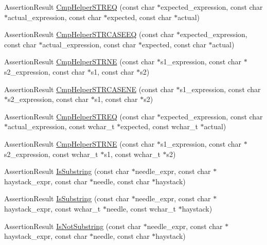 \begin{DoxyCompactItemize}
\item 
\-Assertion\-Result \hyperlink{namespacetesting_1_1internal_aac3ea8412a9d5f786b992a2b06aeb353}{\-Cmp\-Helper\-S\-T\-R\-E\-Q} (const char $\ast$expected\-\_\-expression, const char $\ast$actual\-\_\-expression, const char $\ast$expected, const char $\ast$actual)
\item 
\-Assertion\-Result \hyperlink{namespacetesting_1_1internal_aa5c3543f39545113a66c5b4d8f829fc6}{\-Cmp\-Helper\-S\-T\-R\-C\-A\-S\-E\-E\-Q} (const char $\ast$expected\-\_\-expression, const char $\ast$actual\-\_\-expression, const char $\ast$expected, const char $\ast$actual)
\item 
\-Assertion\-Result \hyperlink{namespacetesting_1_1internal_a24dfe04b51cda2637868440f0e6a7110}{\-Cmp\-Helper\-S\-T\-R\-N\-E} (const char $\ast$s1\-\_\-expression, const char $\ast$s2\-\_\-expression, const char $\ast$s1, const char $\ast$s2)
\item 
\-Assertion\-Result \hyperlink{namespacetesting_1_1internal_a87ee06a47690ee4681d40e1bf6a4a3c5}{\-Cmp\-Helper\-S\-T\-R\-C\-A\-S\-E\-N\-E} (const char $\ast$s1\-\_\-expression, const char $\ast$s2\-\_\-expression, const char $\ast$s1, const char $\ast$s2)
\item 
\-Assertion\-Result \hyperlink{namespacetesting_1_1internal_a56283a915608e035442712d3b92a105b}{\-Cmp\-Helper\-S\-T\-R\-E\-Q} (const char $\ast$expected\-\_\-expression, const char $\ast$actual\-\_\-expression, const wchar\-\_\-t $\ast$expected, const wchar\-\_\-t $\ast$actual)
\item 
\-Assertion\-Result \hyperlink{namespacetesting_1_1internal_a7d89106441de99b36b0971c57caadc2d}{\-Cmp\-Helper\-S\-T\-R\-N\-E} (const char $\ast$s1\-\_\-expression, const char $\ast$s2\-\_\-expression, const wchar\-\_\-t $\ast$s1, const wchar\-\_\-t $\ast$s2)
\item 
\-Assertion\-Result \hyperlink{namespacetesting_aa47c8fed5266f284499c1c82dd0e167e}{\-Is\-Substring} (const char $\ast$needle\-\_\-expr, const char $\ast$haystack\-\_\-expr, const char $\ast$needle, const char $\ast$haystack)
\item 
\-Assertion\-Result \hyperlink{namespacetesting_a9b82c8fa11b142a504c9d30fa3ed3ccb}{\-Is\-Substring} (const char $\ast$needle\-\_\-expr, const char $\ast$haystack\-\_\-expr, const wchar\-\_\-t $\ast$needle, const wchar\-\_\-t $\ast$haystack)
\item 
\-Assertion\-Result \hyperlink{namespacetesting_aeb4296c0ab6b8b4bb90dd7b28369f601}{\-Is\-Not\-Substring} (const char $\ast$needle\-\_\-expr, const char $\ast$haystack\-\_\-expr, const char $\ast$needle, const char $\ast$haystack)

\end{DoxyCompactItemize}
